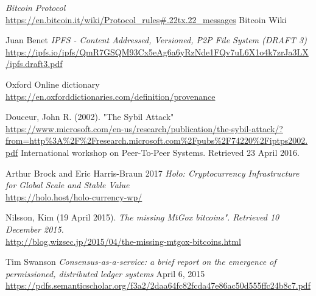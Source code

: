 \documentclass[twocolumn,showpacs,%
  nofootinbib,aps,superscriptaddress,%
  eqsecnum,prd,notitlepage,showkeys,10pt]{revtex4-1}
\begin{document}
\begin{thebibliography}{9}
\textit{Bitcoin Protocol}
\\\url{https://en.bitcoin.it/wiki/Protocol_rules#.22tx.22_messages}
Bitcoin Wiki

Juan Benet
\textit{IPFS - Content Addressed, Versioned, P2P File System (DRAFT 3)}
\\\url{https://ipfs.io/ipfs/QmR7GSQM93Cx5eAg6a6yRzNde1FQv7uL6X1o4k7zrJa3LX/ipfs.draft3.pdf}

Oxford 
Online dictionary
\\\url{https://en.oxforddictionaries.com/definition/provenance}

Douceur, John R. (2002).
"The Sybil Attack"
\\\url{https://www.microsoft.com/en-us/research/publication/the-sybil-attack/?from=http%3A%2F%2Fresearch.microsoft.com%2Fpubs%2F74220%2Fiptps2002.pdf}
International workshop on Peer-To-Peer Systems. Retrieved 23 April 2016.


Arthur Brock and Eric Harris-Braun 2017
\textit{Holo: Cryptocurrency Infrastructure
for Global Scale and Stable Value}
\\\url{https://holo.host/holo-currency-wp/}

 Nilsson, Kim (19 April 2015).
 \textit{The missing MtGox bitcoins". Retrieved 10 December 2015.}
\\\url{http://blog.wizsec.jp/2015/04/the-missing-mtgox-bitcoins.html}

Tim Swanson
\textit{Consensus-as-a-service: a brief report on the emergence of permissioned, distributed ledger systems}
April 6, 2015
\\\url{https://pdfs.semanticscholar.org/f3a2/2daa64fc82fcda47e86ac50d555ffc24b8c7.pdf}

\end{thebibliography}
\end{document}
